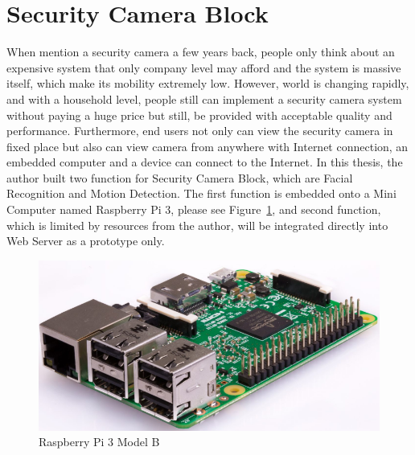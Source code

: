 \section{Security Camera Block}
When mention a security camera a few years back, people only think about an expensive system that only company level may afford and the system is massive itself, which make its mobility extremely low. However, world is changing rapidly, and with a household level, people still can implement a security camera system without paying a huge price but still, be provided with acceptable quality and performance. Furthermore, end users not only can view the security camera in fixed place but also can view camera from anywhere with Internet connection, an embedded computer and a device can connect to the Internet. In this thesis, the author built two function for Security Camera Block, which are Facial Recognition and Motion Detection. The first function is embedded onto a Mini Computer named Raspberry Pi 3, please see Figure~\ref{fig:rpiImage}, and second function, which is limited by resources from the author, will be integrated directly into Web Server as a prototype only.
\begin{figure}[!ht]
  \begin{center}
  \includegraphics[scale=0.72]{images/rpi.png}
  \caption{Raspberry Pi 3 Model B}
  \label{fig:rpiImage}
  \end{center}
\end{figure}

